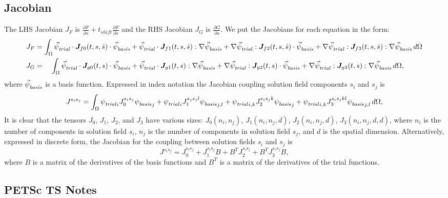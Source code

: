 \subsection{Jacobian}

The LHS Jacobian $J_F$ is $\frac{\partial F}{\partial s} + t_\mathit{shift}
\frac{\partial F}{\partial \dot{s}}$ and the RHS Jacobian $J_G$ is
$\frac{\partial G}{\partial s}$. We put the Jacobians for each equation in the form:
\begin{align}
  \label{eqn:jacobian:form}
  J_F &= \int_\Omega \trialvec \cdot \tensor{J}_{f0}(t,s,\dot{s}) \cdot \basisvec
  + \trialvec \cdot \tensor{J}_{f1}(t,s,\dot{s}) : \nabla \basisvec
  + \nabla \trialvec : \tensor{J}_{f2}(t,s,\dot{s}) \cdot \basisvec
  + \nabla \trialvec : \tensor{J}_{f3}(t,s,\dot{s}) : \nabla \basisvec \, d\Omega \\
%
  J_G &= \quad \int_\Omega \trialvec \cdot \tensor{J}_{g0}(t,s) \cdot \basisvec
  + \trialvec \cdot \tensor{J}_{g1}(t,s) : \nabla \basisvec
  + \nabla \trialvec : \tensor{J}_{g2}(t,s) \cdot \basisvec
  + \nabla \trialvec : \tensor{J}_{g3}(t,s) : \nabla \basisvec \, d\Omega,
\end{align}
where ${\vec{\psi}_\mathit{basis}^{}}$ is a basis function.  Expressed in index notation
the Jacobian coupling solution field components $s_i$ and $s_j$ is
\begin{equation}
\label{eqn:jacobian:index:form}
J^{s_is_j} = \int_\Omega {\psi_\mathit{trial}^{}}_i J_0^{s_is_j} {\psi_\mathit{basis}^{}}_j + {\psi_\mathit{trial}^{}}_i 
J_1^{s_js_jl} 
{\psi_\mathit{basis}^{}}_{j,l} + {\psi_\mathit{trial}^{}}_{i,k} J_2^{s_is_jk} {\psi_\mathit{basis}^{}}_j + {\psi_\mathit{trial}^{}}_{i,k} 
J_3^{s_is_jkl} 
{\psi_\mathit{basis}^{}}_{j,l} \, d\Omega, 
\end{equation}
It is clear that the tensors $J_0$, $J_1$, $J_2$, and $J_3$ have
various sizes: $J_0(n_i,n_j)$, $J_1(n_i,n_j,d)$, $J_2(n_i,n_j,d)$,
$J_3(n_i,n_j,d,d)$, where $n_i$ is the number of components in
solution field $s_i$, $n_j$ is the number of components in solution
field $s_j$, and $d$ is the spatial dimension.  Alternatively,
expressed in discrete form, the Jacobian for the coupling between
solution fields $s_i$ and $s_j$ is
\begin{equation}
  \label{eqn:jacobian:discrete:form}
  J^{s_is_j} = J_{0}^{s_is_j} + J_{1}^{s_is_j} B + B^T J_{2}^{s_is_j} + B^T J_{3}^{s_is_j} B,
\end{equation}
where $B$ is a matrix of the derivatives of the basis functions and $B^T$
is a matrix of the derivatives of the trial functions. 

\subsection{PETSc TS Notes}

